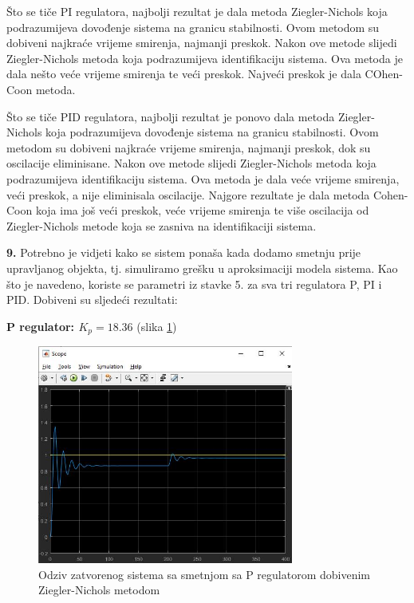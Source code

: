 Što se tiče PI regulatora, najbolji rezultat je dala metoda Ziegler-Nichols koja podrazumijeva dovođenje sistema na granicu stabilnosti. Ovom metodom su dobiveni najkraće vrijeme smirenja, najmanji preskok. Nakon ove metode slijedi Ziegler-Nichols metoda koja podrazumijeva identifikaciju sistema. Ova metoda je dala nešto veće vrijeme smirenja te veći preskok. Najveći preskok je dala COhen-Coon metoda.

Što se tiče PID regulatora, najbolji rezultat je ponovo dala metoda Ziegler-Nichols koja podrazumijeva dovođenje sistema na granicu stabilnosti. Ovom metodom su dobiveni najkraće vrijeme smirenja, najmanji preskok, dok su oscilacije eliminisane. Nakon ove metode slijedi Ziegler-Nichols metoda koja podrazumijeva identifikaciju sistema. Ova metoda je dala veće vrijeme smirenja, veći preskok, a nije eliminisala oscilacije. Najgore rezultate je dala metoda Cohen-Coon koja ima još veći preskok, veće vrijeme smirenja te više oscilacija od Ziegler-Nichols metode koja se zasniva na identifikaciji sistema.

\textbf{9.} Potrebno je vidjeti kako se sistem ponaša kada dodamo smetnju prije upravljanog objekta, tj. simuliramo grešku u aproksimaciji modela sistema. Kao što je navedeno, koriste se parametri iz stavke 5. za sva tri regulatora P, PI i PID. Dobiveni su sljedeći rezultati:

\textbf{P regulator: $K_p=18.36$} (slika \ref{fig:z1_25})

\begin{figure} [H]
  \centering
  \includegraphics[width=0.75\textwidth]{z1_25}
  \caption{Odziv zatvorenog sistema sa smetnjom sa P regulatorom dobivenim Ziegler-Nichols metodom}
  \label{fig:z1_25}
\end{figure} 

